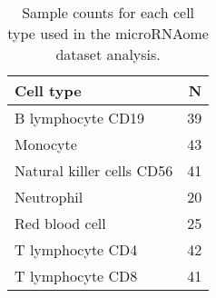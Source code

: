 \begin{table}[ht]
\centering
\begin{tabular}{lr}
  \hline
Cell type & N \\ 
  \hline
B lymphocyte CD19 &  39 \\ 
  Monocyte &  43 \\ 
  Natural killer cells CD56 &  41 \\ 
  Neutrophil &  20 \\ 
  Red blood cell &  25 \\ 
  T lymphocyte CD4 &  42 \\ 
  T lymphocyte CD8 &  41 \\ 
   \hline
\end{tabular}
\caption{Sample counts for each cell type used in the microRNAome dataset analysis.} 
\label{supp-tbl1}
\end{table}
